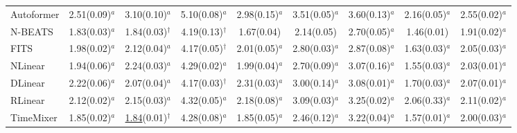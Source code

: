 \begin{table}[!t]
\begin{adjustbox}{max width=\linewidth}
\begin{tabular}{lcccccccc}
Autoformer & 2.51{\scriptsize\color{gray}(0.09)}$^{a}$ & 3.10{\scriptsize\color{gray}(0.10)}$^{a}$ & 5.10{\scriptsize\color{gray}(0.08)}$^{a}$ & 2.98{\scriptsize\color{gray}(0.15)}$^{a}$ & 3.51{\scriptsize\color{gray}(0.05)}$^{a}$ & 3.60{\scriptsize\color{gray}(0.13)}$^{a}$ & 2.16{\scriptsize\color{gray}(0.05)}$^{a}$ & 2.55{\scriptsize\color{gray}(0.02)}$^{a}$ \\
N-BEATS & 1.83{\scriptsize\color{gray}(0.03)}$^{a}$ & 1.84{\scriptsize\color{gray}(0.03)}$^{\dagger{}}$ & 4.19{\scriptsize\color{gray}(0.13)}$^{\dagger{}}$ & 1.67{\scriptsize\color{gray}(0.04)} & 2.14{\scriptsize\color{gray}(0.05)} & 2.70{\scriptsize\color{gray}(0.05)}$^{a}$ & 1.46{\scriptsize\color{gray}(0.01)} & 1.91{\scriptsize\color{gray}(0.02)}$^{a}$ \\
FITS & 1.98{\scriptsize\color{gray}(0.02)}$^{a}$ & 2.12{\scriptsize\color{gray}(0.04)}$^{a}$ & 4.17{\scriptsize\color{gray}(0.05)}$^{\dagger{}}$ & 2.01{\scriptsize\color{gray}(0.05)}$^{a}$ & 2.80{\scriptsize\color{gray}(0.03)}$^{a}$ & 2.87{\scriptsize\color{gray}(0.08)}$^{a}$ & 1.63{\scriptsize\color{gray}(0.03)}$^{a}$ & 2.05{\scriptsize\color{gray}(0.03)}$^{a}$ \\
NLinear & 1.94{\scriptsize\color{gray}(0.06)}$^{a}$ & 2.24{\scriptsize\color{gray}(0.03)}$^{a}$ & 4.29{\scriptsize\color{gray}(0.02)}$^{a}$ & 1.99{\scriptsize\color{gray}(0.04)}$^{a}$ & 2.70{\scriptsize\color{gray}(0.09)}$^{a}$ & 3.07{\scriptsize\color{gray}(0.16)}$^{a}$ & 1.55{\scriptsize\color{gray}(0.03)}$^{a}$ & 2.03{\scriptsize\color{gray}(0.01)}$^{a}$ \\
DLinear & 2.22{\scriptsize\color{gray}(0.06)}$^{a}$ & 2.07{\scriptsize\color{gray}(0.04)}$^{a}$ & 4.17{\scriptsize\color{gray}(0.03)}$^{\dagger{}}$ & 2.31{\scriptsize\color{gray}(0.03)}$^{a}$ & 3.00{\scriptsize\color{gray}(0.14)}$^{a}$ & 3.08{\scriptsize\color{gray}(0.01)}$^{a}$ & 1.70{\scriptsize\color{gray}(0.03)}$^{a}$ & 2.07{\scriptsize\color{gray}(0.01)}$^{a}$ \\
RLinear & 2.12{\scriptsize\color{gray}(0.02)}$^{a}$ & 2.15{\scriptsize\color{gray}(0.03)}$^{a}$ & 4.32{\scriptsize\color{gray}(0.05)}$^{a}$ & 2.18{\scriptsize\color{gray}(0.08)}$^{a}$ & 3.09{\scriptsize\color{gray}(0.03)}$^{a}$ & 3.25{\scriptsize\color{gray}(0.02)}$^{a}$ & 2.06{\scriptsize\color{gray}(0.33)}$^{a}$ & 2.11{\scriptsize\color{gray}(0.02)}$^{a}$ \\
TimeMixer & 1.85{\scriptsize\color{gray}(0.02)}$^{a}$ & \underline{1.84}{\scriptsize\color{gray}(0.01)}$^{\dagger{}}$ & 4.28{\scriptsize\color{gray}(0.08)}$^{a}$ & 1.85{\scriptsize\color{gray}(0.05)}$^{a}$ & 2.46{\scriptsize\color{gray}(0.12)}$^{a}$ & 3.22{\scriptsize\color{gray}(0.04)}$^{a}$ & 1.57{\scriptsize\color{gray}(0.01)}$^{a}$ & 2.00{\scriptsize\color{gray}(0.03)}$^{a}$ \\

\end{tabular}
\end{adjustbox}
\end{table}
